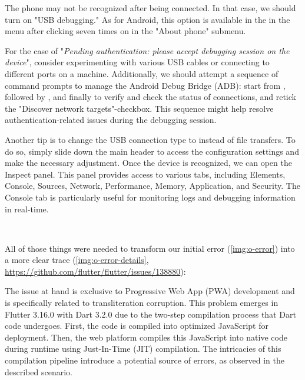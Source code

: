 
\noindent The phone may not be recognized after being connected. In that case, we should turn on "USB debugging." As for 
Android, this option is available in the  in the  menu after clicking seven times on 
 in the "About phone" submenu.

For the case of "\emph{Pending authentication: please accept debugging session on the device}", consider experimenting 
with various USB cables or connecting to different ports on a machine. Additionally, we should attempt a sequence of 
command prompts to manage the Android Debug Bridge (ADB): start from , followed by 
, and finally  to verify and check the status of connections, and retick the 
"Discover network targets"-checkbox. This sequence might help resolve authentication-related issues during the debugging 
session.

Another tip is to change the USB connection type to  instead of file transfers. To do so, simply slide down the 
main header to access the configuration settings and make the necessary adjustment. Once the device is recognized, we 
can open the Inspect panel. This panel provides access to various tabs, including Elements, Console, Sources, Network, 
Performance, Memory, Application, and Security. The Console tab is particularly useful for monitoring logs and debugging 
information in real-time.

~

\noindent All of those things were needed to transform our initial error (\cref{img:o-error}) into a more clear trace 
(\cref{img:o-error-details}, 
\href{https://github.com/flutter/flutter/issues/138880}{https://github.com/flutter/flutter/issues/138880}):


\noindent The issue at hand is exclusive to Progressive Web App (PWA) development and is specifically related to 
transliteration corruption. This problem emerges in Flutter 3.16.0 with Dart 3.2.0 due to the two-step compilation 
process that Dart code undergoes. First, the code is compiled into optimized JavaScript for deployment. Then, the web 
platform compiles this JavaScript into native code during runtime using Just-In-Time (JIT) compilation. The intricacies 
of this compilation pipeline introduce a potential source of errors, as observed in the described scenario.

